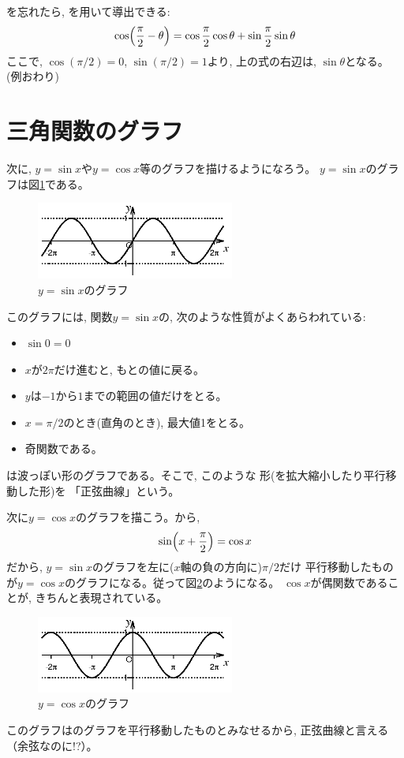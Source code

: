 \begin{exmpl}
を忘れたら, を用いて導出できる:
\begin{eqnarray*}
\cos \Bigl(\frac{\pi}{2} - \theta\Bigr) = \cos\frac{\pi}{2}\cos\theta+\sin\frac{\pi}{2}\sin\theta
\end{eqnarray*}
ここで, $\cos(\pi/2)=0$, $\sin(\pi/2)=1$より, 上の式の右辺は, $\sin \theta$となる。(例おわり)
\end{exmpl}\mv



\section{三角関数のグラフ}

次に, $y=\sin x$や$y=\cos x$等のグラフを描けるようになろう。
$y=\sin x$のグラフは図\ref{fig:sin}である。
\begin{figure}[h]
    \centering
    \includegraphics[width=6.5cm]{sin.eps}
    \caption{$y=\sin x$のグラフ}\label{fig:sin}
\end{figure}

このグラフには, 関数$y=\sin x$の, 次のような性質がよくあらわれている:
\begin{itemize}
\item $\sin 0=0$
\item $x$が$2\pi$だけ進むと, もとの値に戻る。
\item $y$は$-1$から$1$までの範囲の値だけをとる。
\item $x=\pi/2$のとき(直角のとき), 最大値1をとる。
\item 奇関数である。
\end{itemize}

は波っぽい形のグラフである。そこで, このような
形(を拡大縮小したり平行移動した形)を
「正弦曲線」という。

次に$y=\cos x$のグラフを描こう。から, 
\begin{eqnarray}\sin\Bigl(x+\frac{\pi}{2}\Bigr)=\cos x\end{eqnarray}
だから, $y=\sin x$のグラフを左に($x$軸の負の方向に)$\pi/2$だけ
平行移動したものが$y=\cos x$のグラフになる。従って図\ref{fig:cos}のようになる。
$\cos x$が偶関数であることが, きちんと表現されている。\hv
\begin{figure}[h]
    \centering
    \includegraphics[width=6.5cm]{cos.eps}
    \caption{$y=\cos x$のグラフ}\label{fig:cos}
\end{figure}
このグラフはのグラフを平行移動したものとみなせるから, 
正弦曲線と言える（余弦なのに!?）。

